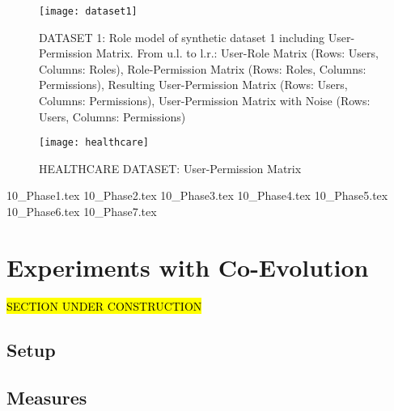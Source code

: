 \begin{figure}[H]
    \centering
    \texttt{[image: dataset1]}
    \caption{DATASET 1: Role model of synthetic dataset 1 including User-Permission Matrix. From u.l. to l.r.: User-Role Matrix (Rows: Users, Columns: Roles), Role-Permission Matrix (Rows: Roles, Columns: Permissions), Resulting User-Permission Matrix (Rows: Users, Columns: Permissions), User-Permission Matrix with Noise (Rows: Users, Columns: Permissions)}
    \label{fig:dataset1}
\end{figure}

\begin{figure}[H]
    \centering
    \texttt{[image: healthcare]}
    \caption{HEALTHCARE DATASET: User-Permission Matrix}
    \label{fig:healthcare}
\end{figure}

{10_Phase1.tex}
{10_Phase2.tex}
{10_Phase3.tex}
{10_Phase4.tex}
{10_Phase5.tex}
{10_Phase6.tex}
{10_Phase7.tex}

\section{Experiments with Co-Evolution}
\hl{SECTION UNDER CONSTRUCTION}\\
\subsection{Setup}
\subsection{Measures}

\iffalse
\section{Experiments with Human Interaction}
\subsection{Setup}
\begin{itemize}
    \item Number of turns
    \item Random Start-population
    \item Fixed Start-population
\end{itemize}
\subsection{Measures}
\begin{itemize}
    \item Fitness (Min, Max, Avg)
    \item Time complexity
    \item Space complexity
\end{itemize}
\fi
